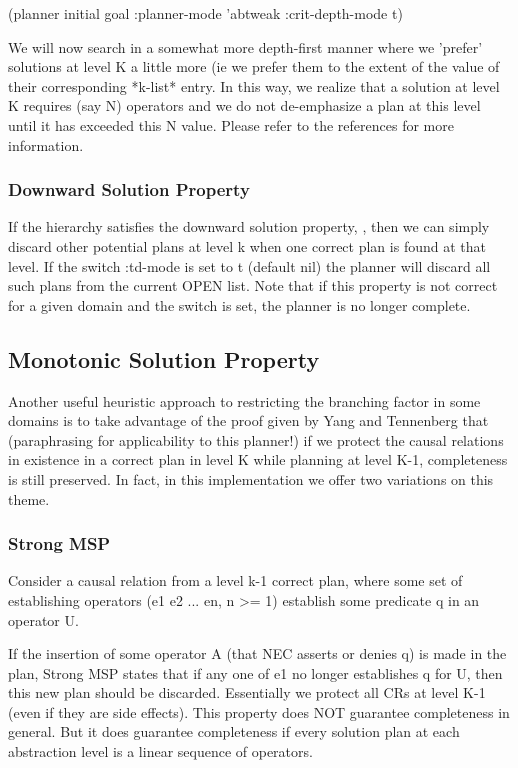 (planner initial goal :planner-mode 'abtweak :crit-depth-mode t)

We will now search in a somewhat more depth-first manner where we 'prefer'
solutions at level K a little more (ie we prefer them to the extent of the
value of their corresponding *k-list* entry.  In this way, we realize that a
solution at level K requires (say N) operators and we do not de-emphasize a
plan at this level until it has exceeded this N value.  Please refer to the
references for more information.

\subsubsection{Downward Solution Property}

If the hierarchy satisfies the downward solution property, \cite{downward},  then we can simply discard
other potential plans at level k when one correct plan is found at that level.
If the switch :td-mode is set to t (default nil) the planner will discard all
such plans from the current OPEN list.  Note that if this property is not
correct for a given domain and the switch is set, the planner is no longer
complete. 

\subsection{Monotonic Solution Property}

Another useful heuristic approach to restricting the branching factor in some
domains is to take advantage of the proof given by Yang and Tennenberg that
(paraphrasing for applicability to this planner!) if we protect the causal
relations in existence in a correct plan in level K while planning at level
K-1, completeness is still preserved.  In fact, in this implementation we offer
two variations on this theme.

\subsubsection{Strong MSP}

Consider a causal relation from a level k-1 correct plan, where
some set of establishing operators (e1 e2 ... en, n >= 1) establish some
predicate q in an operator U.

If the insertion of some operator A (that NEC asserts or denies q) is made in
the plan, Strong MSP states that if any one of e1 no longer establishes q for
U, then this new plan should be discarded.  Essentially we protect all CRs at
level K-1 (even if they are side effects).  This property does NOT guarantee completeness in general.  But it does guarantee completeness if every solution plan at each abstraction level is a linear sequence of operators.

